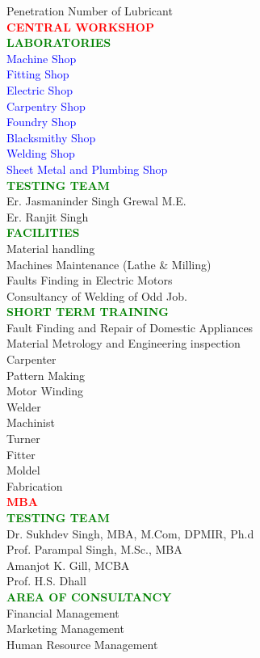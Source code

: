 Penetration Number of Lubricant \\
\textcolor{red}{\bf{\Large CENTRAL WORKSHOP}}\\
\textcolor{green}{\bf \large LABORATORIES}\\
\textcolor{blue}{Machine Shop}\\
\textcolor{blue}{Fitting Shop}\\
\textcolor{blue}{Electric Shop}\\
\textcolor{blue}{Carpentry Shop}\\
\textcolor{blue}{Foundry Shop}\\
\textcolor{blue}{Blacksmithy Shop}\\
\textcolor{blue}{Welding Shop}\\
\textcolor{blue}{Sheet Metal and Plumbing Shop}\\
\textcolor{green}{\bf\large TESTING TEAM}\\
Er. Jasmaninder Singh Grewal M.E.\\
Er. Ranjit Singh\\
\textcolor{green}{\bf FACILITIES}\\
Material handling\\
Machines Maintenance (Lathe & Milling)\\
Faults Finding in Electric Motors \\
Consultancy of Welding of Odd Job. \\
\textcolor{green}{\bf SHORT TERM TRAINING}\\
Fault Finding and Repair of Domestic Appliances\\
Material Metrology and Engineering inspection \\
Carpenter \\
Pattern Making \\
Motor Winding\\
Welder \\
Machinist\\
Turner \\
Fitter\\
Moldel\\
Fabrication \\
\textcolor{red}{\bf{\Large MBA}}\\
\textcolor{green}{\bf\large TESTING TEAM}\\
Dr. Sukhdev Singh, MBA, M.Com, DPMIR, Ph.d\\
Prof. Parampal Singh, M.Sc., MBA \\
Amanjot K. Gill, MCBA \\
Prof. H.S. Dhall\\
\textcolor{green}{\bf AREA OF CONSULTANCY}\\
Financial Management\\
Marketing Management\\
Human Resource Management\\
